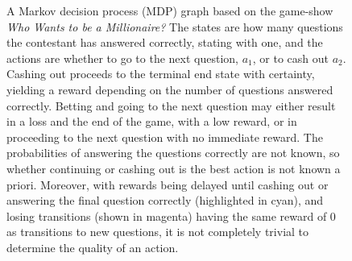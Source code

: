 \begin{figure}
    \vspace{1cm}

    \caption[
        Example Markov decision process graph.
    ]
    {
        A Markov decision process (MDP) graph based on the game-show \textit{Who Wants to be a Millionaire?}
        The states are how many questions the contestant has answered correctly, stating with one, and the actions are whether to go to the next question, $a_1$, or to cash out $a_2$.
        Cashing out proceeds to the terminal end state with certainty, yielding a reward depending on the number of questions answered correctly.
        Betting and going to the next question may either result in a loss and the end of the game, with a low reward, or in proceeding to the next question with no immediate reward.
        The probabilities of answering the questions correctly are not known, so whether continuing or cashing out is the best action is not known a priori.
        Moreover, with rewards being delayed until cashing out or answering the final question correctly (highlighted in cyan), and losing transitions (shown in magenta) having the same reward of 0 as transitions to new questions, it is not completely trivial to determine the quality of an action.
    }
    \label{fig:mdp}
\end{figure}



